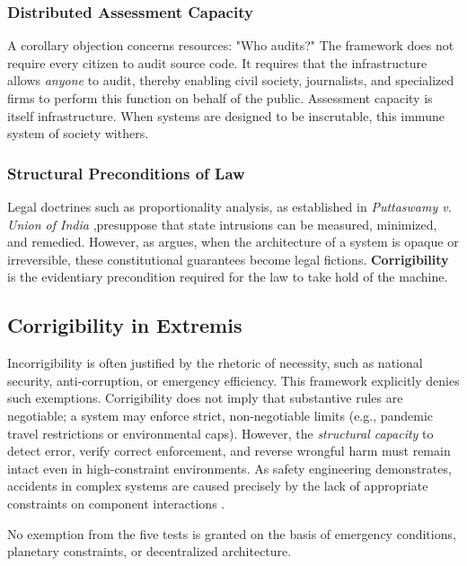 \subsubsection{Distributed Assessment Capacity}
A corollary objection concerns resources: "Who audits?" The framework does not require every citizen to audit source code. It requires that the infrastructure allows \textit{anyone} to audit, thereby enabling civil society, journalists, and specialized firms to perform this function on behalf of the public. Assessment capacity is itself infrastructure. When systems are designed to be inscrutable, this immune system of society withers.

\subsubsection{Structural Preconditions of Law}
Legal doctrines such as proportionality analysis, as established in \textit{Puttaswamy v. Union of India} \citep{puttaswamy2017},presuppose that state intrusions can be measured, minimized, and remedied. However, as \citet{bhatia2019} argues, when the architecture of a system is opaque or irreversible, these constitutional guarantees become legal fictions. \textbf{Corrigibility} is the evidentiary precondition required for the law to take hold of the machine.

\subsection{Corrigibility in Extremis}

Incorrigibility is often justified by the rhetoric of necessity, such as national security, anti-corruption, or emergency efficiency. This framework explicitly denies such exemptions. Corrigibility does not imply that substantive rules are negotiable; a system may enforce strict, non-negotiable limits (e.g., pandemic travel restrictions or environmental caps). However, the \textit{structural capacity} to detect error, verify correct enforcement, and reverse wrongful harm must remain intact even in high-constraint environments. As safety engineering demonstrates, accidents in complex systems are caused precisely by the lack of appropriate constraints on component interactions \citep{leveson2011}.

\begin{claim}
No exemption from the five tests is granted on the basis of emergency conditions, planetary constraints, or decentralized architecture.
\end{claim}


